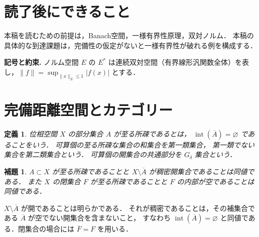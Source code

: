 \documentclass[a5paper,10pt,onecolumn]{jsarticle}
\makeatletter
\theoremstyle{mathnotetheorem}
\newtheorem{definition}[theorem]{定義}
\newtheorem{lemma}[theorem]{補題}
\renewcommand{\proofname}{証明}
\renewenvironment{proof}[1][\proofname]{%
  \par\pushQED{\qed}\normalfont\topsep4\p@\@plus2\p@\relax
  \trivlist\item[\hskip\labelsep\bfseries #1]\ignorespaces
}{\popQED\endtrivlist\@endpefalse}
\makeatother
\begin{document}
\section*{読了後にできること}
本稿を読むための前提は，Banach空間，一様有界性原理，双対ノルム．
本稿の具体的な到達課題は，完備性の仮定がないと一様有界性が破れる例を構成する．


\par\noindent\textbf{記号と約束.}\quad
ノルム空間 $E$ の $E^*$ は連続双対空間（有界線形汎関数全体）を表し，$\|f\|=\sup_{\|x\|_E\le1}|f(x)|$ とする．
\par

\section{完備距離空間とカテゴリー}

\begin{definition}
位相空間 $X$ の部分集合 $A$ が\emph{至る所疎}であるとは，
$\operatorname{int}(\overline A)=\varnothing$ であることをいう．
可算個の至る所疎な集合の和集合を\emph{第一類集合}，
第一類でない集合を\emph{第二類集合}という．
可算個の開集合の共通部分を $G_\delta$ 集合という．
\end{definition}

\begin{lemma}\label{lem:nowhere}
$A\subset X$ が至る所疎であることと
$X\setminus\overline A$ が稠密開集合であることは同値である．
また $X$ の閉集合 $F$ が至る所疎であることと
$F$ の内部が空であることは同値である．
\end{lemma}
\begin{proof}
$X\setminus\overline A$ が開であることは明らかである．
それが稠密であることは，その補集合である
$\overline A$ が空でない開集合を含まないこと，
すなわち $\operatorname{int}(\overline A)=\varnothing$
と同値である．閉集合の場合には $\overline F=F$ を用いる．
\end{proof}
\end{document}
